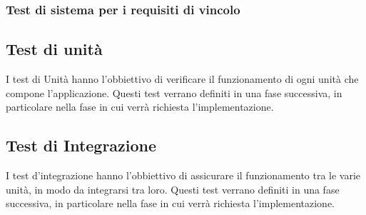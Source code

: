 \subsubsection{Test di sistema per i requisiti di vincolo}
    \def\testspecification{
    {   
        TSOV1,
        Si verifica che il codice sorgente dell'applicazione sia open source,
        NI,
        RVO1
    },
    {   
        TSDV,
        Si verifica che l'applicazione sia sviluppata in Javascript con l'utilizzo della libreria d3.js,
        NI,
        RVD2 RVD2.1
    },
    {   
        TSDV2.2,
        Si verifica che il backend dell'applicazione sia sviluppato con node.js con l'utilizzo del framework Express,
        NI,
        RVD2.2
    },
    {   
        TSDV2.3,
        Si verifica che il frontend dell'applicazione sia sviluppato con React con l'utilizzo del framework Ant Design,
        NI,
        RVD2.3
    },
    {   
        TSOV3,
        Si verifica che i dati siano convertibili in JSON,
        NI,
        RVO3
    },
    {   
        TSOV4,
        Si verifica che nella visualizzazione Scatter Plot Matrix si possano visualizzare al massimo 5 features,
        NI,
        RVO4
    },
    {   
        TSDV5,
        Si verifica che la libreria per PCA sia ml-pca,
        NI,
        RVD5
    },
    {   
        TSDV6,
        Si verifica che la libreria per Umap sia tsne-js,
        NI,
        RVD6
    },
    {   
        TSDV7,
        Si verifica che la libreria per t-SNE sia tsne-js,
        NI,
        RVD7
    },
    {   
        TSDV8,
        Si verifica che la libreria per le distanze sia ml-distance,
        NI,
        RVD8
    },
    {   
        TSDV9,
        Si verifica che la libreria per la matrice di correlazione sia jeezy,
        NI,
        RVD9
    },
      }
    
    
\subsection{Test di unità}
    I test di Unità hanno l'obbiettivo di verificare il funzionamento di ogni unità che compone l'applicazione. Questi test verrano definiti in una fase successiva, in particolare nella fase in cui verrà richiesta l'implementazione.
    
\subsection{Test di Integrazione}
    I test d'integrazione hanno l'obbiettivo di assicurare il funzionamento tra le varie unità, in modo da integrarsi tra loro. Questi test verrano definiti in una fase successiva, in particolare nella fase in cui verrà richiesta l'implementazione.
    
